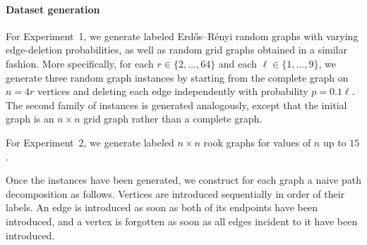 


\paragraph*{Dataset generation}
For Experiment~1, we generate labeled Erd\H{o}s--R\'enyi random graphs with
varying edge-deletion probabilities, as well as random grid graphs obtained in a
similar fashion. More specifically, for each $r \in \{2,\dots,64\}$ and each
$\ell \in \{1,\dots,9\}$, we generate three random graph instances by starting
from the complete graph on $n = 4r$ vertices and deleting each edge independently
with probability $p = 0.1\ell$. The second family of instances is generated
analogously, except that the initial graph is an $n \times n$ grid graph rather
than a complete graph.

For Experiment~2, we generate labeled $n \times n$ rook graphs for values of
$n$ up to $15$.

Once the instances have been generated, we construct for each graph a naive path decomposition as follows. Vertices are introduced sequentially in
order of their labels. An edge is introduced as soon as both of its endpoints
have been introduced, and a vertex is forgotten as soon as all edges incident to
it have been introduced.

